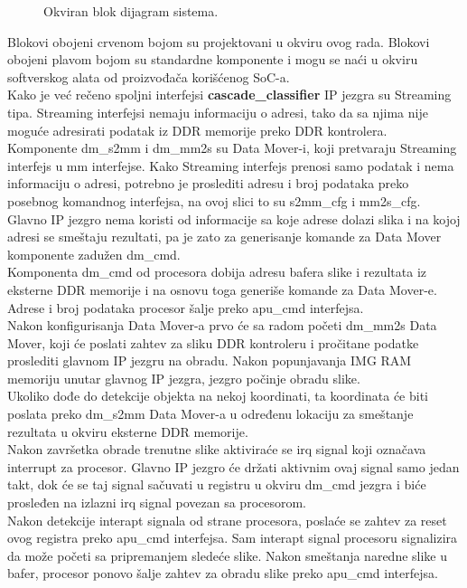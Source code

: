 \begin{figure}[H]
  \centering
  \resizebox{1\textwidth}{!}{%
    
  }
  \caption{Okviran blok dijagram sistema.}
  \label{system_bd_approx}
\end{figure}

Blokovi obojeni crvenom bojom su projektovani u okviru ovog rada.
Blokovi obojeni plavom bojom su standardne komponente i mogu se naći u okviru
softverskog alata od proizvođača korišćenog SoC-a. \\

Kako je već rečeno spoljni interfejsi \textbf{cascade\_classifier} IP jezgra su
Streaming tipa.
Streaming interfejsi nemaju informaciju o adresi, tako da sa njima nije
moguće adresirati podatak iz DDR memorije preko DDR kontrolera. \\

Komponente dm\_s2mm i dm\_mm2s su Data Mover-i, koji pretvaraju Streaming interfejs u \gls{mm}
interfejse.
Kako Streaming interfejs prenosi samo podatak i nema informaciju o
adresi, potrebno je proslediti adresu i broj podataka preko posebnog komandnog
interfejsa, na ovoj slici to su s2mm\_cfg i mm2s\_cfg.\\

Glavno IP jezgro nema koristi od informacije sa koje adrese dolazi slika i na
kojoj adresi se smeštaju rezultati, pa je zato za generisanje komande za Data Mover
komponente zadužen dm\_cmd.\\
Komponenta dm\_cmd od procesora dobija adresu bafera slike i rezultata iz eksterne DDR
memorije i na osnovu toga generiše komande za Data Mover-e. \\
Adrese i broj podataka procesor šalje preko apu\_cmd interfejsa. \\

Nakon konfigurisanja Data Mover-a prvo će sa radom početi dm\_mm2s Data Mover,
koji će poslati zahtev za sliku DDR kontroleru i pročitane podatke proslediti
glavnom IP jezgru na obradu.
Nakon popunjavanja IMG RAM memoriju unutar glavnog IP jezgra, jezgro počinje
obradu slike. \\

Ukoliko dođe do detekcije objekta na nekoj koordinati, ta koordinata će biti
poslata preko dm\_s2mm Data Mover-a u određenu lokaciju za smeštanje rezultata u
okviru eksterne DDR memorije. \\

Nakon završetka obrade trenutne slike aktiviraće se irq signal koji označava
interrupt za procesor.
Glavno IP jezgro će držati aktivnim ovaj signal samo jedan takt, dok će se taj
signal sačuvati u registru u okviru dm\_cmd jezgra i biće prosleđen na izlazni
irq signal povezan sa procesorom. \\
Nakon detekcije interapt signala od strane procesora, poslaće se zahtev za reset
ovog registra preko apu\_cmd interfejsa.
Sam interapt signal procesoru signalizira da može početi sa pripremanjem sledeće
slike.
Nakon smeštanja naredne slike u bafer, procesor ponovo šalje zahtev za obradu
slike preko apu\_cmd interfejsa. \\

